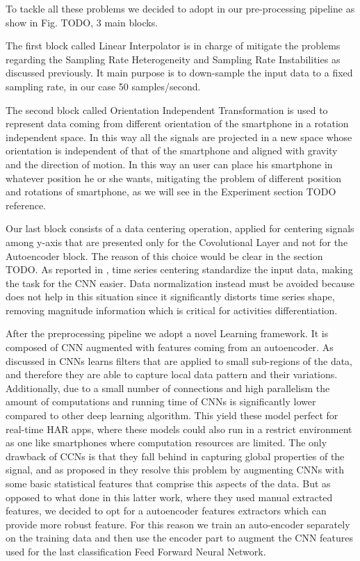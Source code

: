To tackle all these problems we decided to adopt in our pre-processing pipeline as show in Fig. TODO, 3 main blocks.

The first block called Linear Interpolator is in charge of mitigate the problems regarding the Sampling Rate Heterogeneity and Sampling Rate Instabilities as discussed previously. It main purpose is to down-sample the input data to a fixed sampling rate, in our case 50 samples/second.

The second block called Orientation Independent Transformation is used to represent data coming from different orientation of the smartphone in a rotation independent space. In this way all the signals are projected in a new space whose orientation is independent of that of the smartphone and aligned with gravity and the direction of motion. In this way an user can place his smartphone in whatever position he or she wants, mitigating the problem of different position and rotations of smartphone, as we will see in the Experiment section TODO reference.

Our last block consists of a data centering operation, applied for centering signals among y-axis that are presented only for the Covolutional Layer and not for the Autoencoder block. The reason of this choice would be clear in the section TODO. As reported in \cite{ignatov2018real}, time series centering standardize the input data, making the task for the CNN easier. Data normalization instead must be avoided because does not help in this situation since it significantly distorts time series shape, removing magnitude information which is critical for activities differentiation.

After the preprocessing pipeline we adopt a novel Learning framework. It is composed of CNN augmented with features coming from an autoencoder. As discussed in \cite{ignatov2018real} CNNs learns filters that are applied to small sub-regions of the data, and therefore they are able to capture local data pattern and their variations. Additionally, due to a small number of connections and high parallelism the amount of computations and running time of CNNs is significantly lower compared to other deep learning algorithm. This yield these model perfect for real-time HAR apps, where these models could also run in a restrict environment as one like smartphones where computation resources are limited. The only drawback of CCNs is that they fall behind in capturing global properties of the signal, and as proposed in \cite{ignatov2018real} they resolve this problem by augmenting CNNs with some basic statistical features that comprise this aspects of the data. But as opposed to what done in this latter work, where they used manual extracted features, we decided to opt for a autoencoder features extractors which can provide more robust feature. For this reason we train an auto-encoder separately on the training data and then use the encoder part to augment the CNN features used for the last classification Feed Forward Neural Network.

